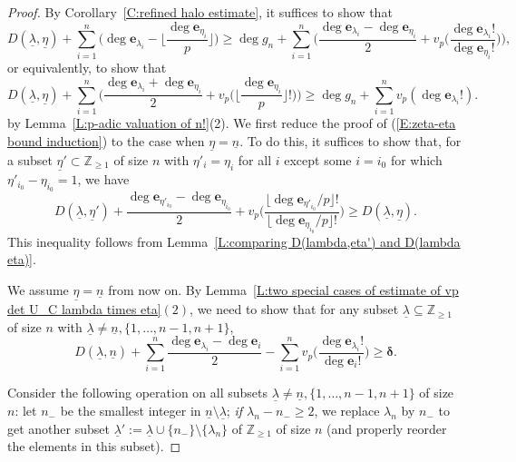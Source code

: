 \documentclass[12pt]{amsart}
\theoremstyle{definition}
\numberwithin{equation}{subsection}
\def\ZZ{\mathbb{Z}}
\def\bfe{\mathbf{e}}
\begin{document}
\begin{proof}
	By Corollary~\ref{C:refined halo estimate}, it
	suffices to show that
	$$
	D(\underline \lambda, \underline \eta) + \sum_{i=1}^n \Big(\deg \bfe_{\lambda_i} - \Big\lfloor \frac{\deg \bfe_{\eta_i}}p \Big\rfloor\Big) \geq \deg g_n+ \sum_{i=1}^n\bigg( \frac{\deg \bfe_{\lambda_i} - \deg \bfe_{\eta_i}}2 + v_p \Big(\frac{\deg \bfe_{\lambda_i}!}{\deg \bfe_{\eta_i}!} \Big)\bigg),
	$$
	or equivalently, to show that
	\begin{equation}
	\label{E:zeta-eta bound induction}
	D(\underline \lambda, \underline \eta) + \sum_{i=1}^n \bigg(\frac{\deg \bfe_{\lambda_i} + \deg \bfe_{\eta_i}}2 + v_p\Big( \Big\lfloor\frac{\deg \bfe_{\eta_i}}p\Big\rfloor!\Big) \bigg) \geq  \deg g_n + \sum_{i=1}^n v_p(\deg \bfe_{\lambda_i}!).
	\end{equation}
	by Lemma~\ref{L:p-adic valuation of n!}(2). We first reduce the proof of (\ref{E:zeta-eta bound induction}) to the case when $\underline \eta=\underline n$. To do this, it suffices to show that, for a subset
	$\underline \eta' \subset \ZZ_{\geq 1}$ of size $n$ with $\eta'_i = \eta_i$ for all $i$ except some $i=i_0$ for which $\eta'_{i_0} - \eta_{i_0} = 1$, we have 
	\begin{equation}
	\label{E:reduce to eta = n}
	D(\underline \lambda, \underline \eta') + \frac{\deg \bfe_{\eta'_{i_0}} - \deg \bfe_{\eta_{i_0}}}2 + v_p \bigg( \frac{\lfloor \deg \bfe_{\eta'_{i_0}}/p \rfloor!}{\lfloor \deg \bfe_{\eta_{i_0}}/p \rfloor!}\bigg) \geq D(\underline \lambda, \underline \eta).
	\end{equation}
	This inequality follows from Lemma~\ref{L:comparing D(lambda,eta') and D(lambda eta)}.
	
	We assume $\underline \eta=\underline n$ from now on. By Lemma~\ref{L:two special cases of estimate of vp det U_C lambda times eta}$(2)$, we need to show that for any subset $\underline \lambda \subseteq \ZZ_{\geq 1}$ of size $n$ with $\underline \lambda \neq \underline n, \{1,\dots, n-1,n+1 \}$,
	\begin{equation}
	\label{E:D lambda n}
	D(\underline \lambda, \underline n) + \sum_{i=1}^n\frac{\deg \bfe_{\lambda_i}-\deg \bfe_i}2-\sum_{i=1}^n v_p\Big( \frac{\deg \bfe_{\lambda_i}!}{\deg \bfe_i!}\Big) \geq \boldsymbol{\delta}.
	\end{equation}
	

\smallskip
Consider the following operation on all subsets $\underline\lambda\neq \underline n, \{1,\dots, n-1,n+1 \}$ of size $n$: let $n_-$ be the smallest integer in $\underline n\setminus \underline \lambda$; \emph{if $\lambda_n - n_- \geq 2$}, we replace $\lambda_n$ by $n_-$ to get another subset $\underline \lambda ':=\underline \lambda \cup\{n_- \}\setminus \{\lambda_n \}$ of $\ZZ_{\geq 1}$ of size $n$  (and properly reorder the elements in this subset). 


\end{proof}
\end{document}
